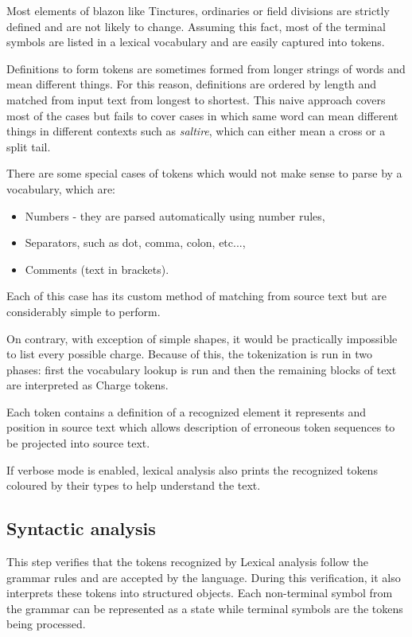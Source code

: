 \documentclass[12pt,a4paper]{article}
\begin{document}
Most elements of blazon like Tinctures, ordinaries or field divisions are strictly defined and are not likely to change.
Assuming this fact, most of the terminal symbols are listed in a lexical vocabulary and are easily captured into tokens.

Definitions to form tokens are sometimes formed from longer strings of words and mean different things. For this reason, definitions are ordered by length and matched from input text from longest to shortest.
This naive approach covers most of the cases but fails to cover cases in which same word can mean different things in different contexts such as \textit{saltire}, which can either mean a cross or a split tail.

There are some special cases of tokens which would not make sense to parse by a vocabulary, which are:
\begin{itemize}
\setlength\itemsep{-0.5em}
\item Numbers - they are parsed automatically using number rules,
\item Separators, such as dot, comma, colon, etc...,
\item Comments (text in brackets).
\end{itemize}
Each of this case has its custom method of matching from source text but are considerably simple to perform.

On contrary, with exception of simple shapes, it would be practically impossible to list every possible charge.
Because of this, the tokenization is run in two phases: first the vocabulary lookup is run and then the remaining blocks of text are interpreted as Charge tokens.

Each token contains a definition of a recognized element it represents and position in source text which allows description of erroneous token sequences to be projected into source text.

If verbose mode is enabled, lexical analysis also prints the recognized tokens coloured by their types to help understand the text.


\subsection{Syntactic analysis}
This step verifies that the tokens recognized by Lexical analysis follow the grammar rules and are accepted by the language. During this verification, it also interprets these tokens into structured objects.
Each non-terminal symbol from the grammar can be represented as a state while terminal symbols are the tokens being processed.
\end{document}
